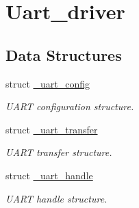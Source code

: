 \hypertarget{group__uart__driver}{}\section{Uart\+\_\+driver}
\label{group__uart__driver}
\subsection*{Data Structures}
\begin{DoxyCompactItemize}
\item 
struct \mbox{\hyperlink{struct__uart__config}{\+\_\+uart\+\_\+config}}
\begin{DoxyCompactList}\small\item\em U\+A\+RT configuration structure. \end{DoxyCompactList}\item 
struct \mbox{\hyperlink{struct__uart__transfer}{\+\_\+uart\+\_\+transfer}}
\begin{DoxyCompactList}\small\item\em U\+A\+RT transfer structure. \end{DoxyCompactList}\item 
struct \mbox{\hyperlink{struct__uart__handle}{\+\_\+uart\+\_\+handle}}
\begin{DoxyCompactList}\small\item\em U\+A\+RT handle structure. \end{DoxyCompactList}\end{DoxyCompactItemize}
